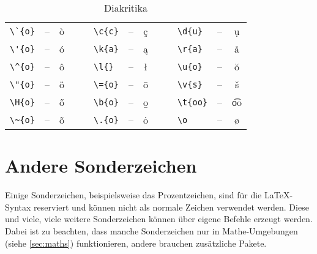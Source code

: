 \begin{table}[H]
	\center
	\begin{tabular}{lccclccclcc}
		\toprule
			\verb|\`{o}| & -- & \`{o} & $\quad$ & \verb|\c{c}| & -- & \c{c} & $\quad$ & \verb|\d{u}| & -- & \d{u} \\
			\verb|\'{o}| & -- & \'{o} & & \verb|\k{a}| & -- & \k{a} & & \verb|\r{a}| & -- & \r{a} \\
			\verb|\^{o}| & -- & \^{o} & & \verb|\l{}| & -- & \l{} & & \verb|\u{o}| & -- & \u{o} \\
			\verb|\"{o}| & -- & \"{o} & & \verb|\={o}| & -- & \={o} & & \verb|\v{s}| & -- & \v{s} \\
			\verb|\H{o}| & -- & \H{o} & & \verb|\b{o}| & -- & \b{o} & & \verb|\t{oo}| & -- & \t{oo} \\
			\verb|\~{o}| & -- & \~{o} & & \verb|\.{o}| & -- & \.{o} & & \verb|\o| & -- & \o \\
		\bottomrule
	\end{tabular}
	\caption{Diakritika}
	\label{tbl:diacritics}
\end{table}

\section{Andere Sonderzeichen}
Einige Sonderzeichen, beispielsweise das Prozentzeichen, sind für die \LaTeX{}-Syntax reserviert und können nicht als normale Zeichen verwendet werden.
Diese und viele, viele weitere Sonderzeichen können über eigene Befehle erzeugt werden.
Dabei ist zu beachten, dass manche Sonderzeichen nur in Mathe-Umgebungen (siehe \cref{sec:maths}) funktionieren, andere brauchen zusätzliche Pakete.

